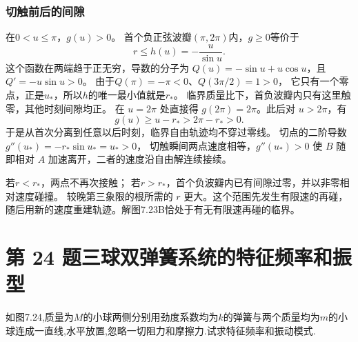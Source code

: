 \documentclass[UTF8,fontset=fandol,a4paper,11pt]{ctexart}
\newcommand{\tagline}[1]{\noindent{\small\color{muted}#1}\par}
\newcommand{\figcaption}[1]{\par\vspace{2pt}{\small\color{muted}#1}\par}
\begin{document}
\subsubsection*{切触前后的间隙}
在$0<u\le\pi$，$g(u)>0$。
首个负正弦波瓣$(\pi,2\pi)$内，$g\ge0$等价于
\[
r\le h(u)=-\frac u{\sin u}.
\]
这个函数在两端趋于正无穷，导数的分子为
$Q(u)=-\sin u+u\cos u$，且$Q'=-u\sin u>0$。
由于$Q(\pi)=-\pi<0$、$Q(3\pi/2)=1>0$，
它只有一个零点，正是$u_*$，所以$h$的唯一最小值就是$r_*$。
临界质量比下，首负波瓣内只有这里触零，其他时刻间隙均正。
在 $u=2\pi$ 处直接得 $g(2\pi)=2\pi$。此后对 $u>2\pi$，有
\[
g(u)\ge u-r_*>2\pi-r_*>0.
\]
于是从首次分离到任意以后时刻，临界自由轨迹均不穿过零线。
切点的二阶导数$g''(u_*)=-r_*\sin u_*=u_*>0$，
切触瞬间两点速度相等，$g''(u_*)>0$ 使 $B$ 随即相对 $A$ 加速离开，二者的速度沿自由解连续接续。

若$r<r_*$，两点不再次接触；
若$r>r_*$，首个负波瓣内已有间隙过零，并以非零相对速度碰撞。
较晚第三象限的根所需的 $r$ 更大。这个范围先发生有限速的再碰，随后用新的速度重建轨迹。解图7.23B恰处于有无有限速再碰的临界。




\section*{第 24 题\quad 三球双弹簧系统的特征频率和振型}

\tagline{M-07-24}

如图7.24,质量为\(M\)的小球两侧分别用劲度系数均为\(k\)的弹簧与两个质量均为\(m\)的小球连成一直线,水平放置,忽略一切阻力和摩擦力.试求特征频率和振动模式.

\begin{center}\begin{minipage}{\linewidth}\centering{}\figcaption{图 7.24}\end{minipage}\end{center}
\end{document}
